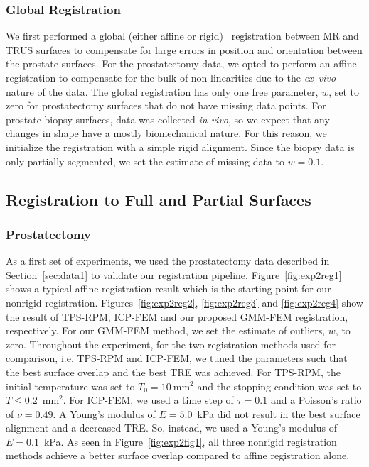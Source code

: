 \documentclass[journal]{IEEEtran}
\begin{document}
\subsubsection{Global Registration}\label{sec:data3}
We first performed a global (either affine or rigid)~\cite{Myronenko10a} registration between MR and TRUS surfaces to compensate for large errors in position and orientation between the prostate surfaces.  For the prostatectomy data, we opted to perform an affine registration to compensate for the bulk of non-linearities due to the \textit{ex~vivo} nature of the data. The global registration has only one free parameter, $w$, set to zero for prostatectomy surfaces that do not have missing data points. For prostate biopsy surfaces, data was collected \textit{in vivo}, so we expect that any changes in shape have a mostly biomechanical nature.  For this reason, we initialize the registration with a simple rigid alignment. Since the biopsy data is only partially segmented, we set the estimate of missing data to $w=0.1$. 
\subsection{Registration to Full and Partial Surfaces}\label{sec:exp1}
\subsubsection{Prostatectomy}
As a first set of experiments, we used the prostatectomy data described in Section~\ref{sec:data1} to validate our registration pipeline. Figure~\ref{fig:exp2reg1} shows a typical affine registration result which is the starting point for our nonrigid registration. Figures~\ref{fig:exp2reg2}, \ref{fig:exp2reg3} and \ref{fig:exp2reg4} show the result of TPS-RPM, ICP-FEM and our proposed GMM-FEM registration, respectively. For our GMM-FEM method, we set the estimate of outliers, $w$, to zero.
Throughout the experiment, for the two registration methods used for comparison, i.e. TPS-RPM and ICP-FEM, we tuned the parameters such that the best surface overlap and the best TRE was achieved. For TPS-RPM, the initial temperature was set to $T_0=10~\mathrm{mm}^2$ and the stopping condition was set to $T\leq0.2$~$\mathrm{mm}^2$. For ICP-FEM, we used a time step of $\tau=0.1$ and a Poisson's ratio of $\nu=0.49$. A Young's modulus of $E=5.0$~kPa did not result in the best surface alignment and a decreased TRE. So, instead, we used a Young's modulus of $E=0.1$~kPa. As seen in Figure~\ref{fig:exp2fig1}, all three nonrigid registration methods achieve a better surface overlap compared to affine registration alone. 
\end{document}
